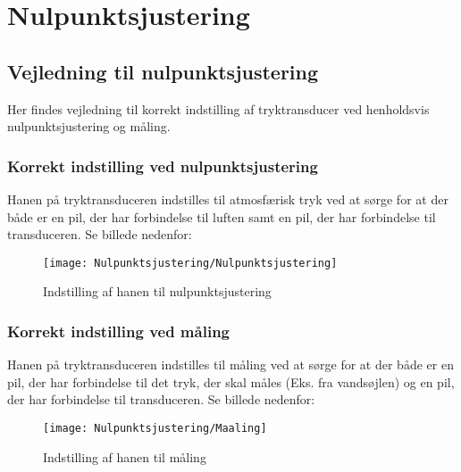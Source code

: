 \chapter{Nulpunktsjustering}

\section{Vejledning til nulpunktsjustering}
Her findes vejledning til korrekt indstilling af tryktransducer ved henholdsvis nulpunktsjustering og måling.

\subsection{Korrekt indstilling ved nulpunktsjustering}
\vspace{0.5 cm}
Hanen på tryktransduceren indstilles til atmosfærisk tryk ved at sørge for at der både er en pil, der har forbindelse til luften samt en pil, der har forbindelse til transduceren. Se billede nedenfor: 
\vspace{0.5 cm}
	\begin{figure}[h!]
	\centering
	\texttt{[image: Nulpunktsjustering/Nulpunktsjustering]}
	\label{fig:nulpunktsjustering}
	\caption{Indstilling af hanen til nulpunktsjustering}
\end{figure}
\subsection{Korrekt indstilling ved måling}
\vspace{0.5 cm}
Hanen på tryktransduceren indstilles til måling ved at sørge for at der både er en pil, der har forbindelse til det tryk, der skal måles (Eks. fra vandsøjlen) og en pil, der har forbindelse til transduceren. Se billede nedenfor: 

\clearpage

	\begin{figure}[h!]
	\centering
	\texttt{[image: Nulpunktsjustering/Maaling]}
	\label{fig:maaling}
	\caption{Indstilling af hanen til måling}
\end{figure}
